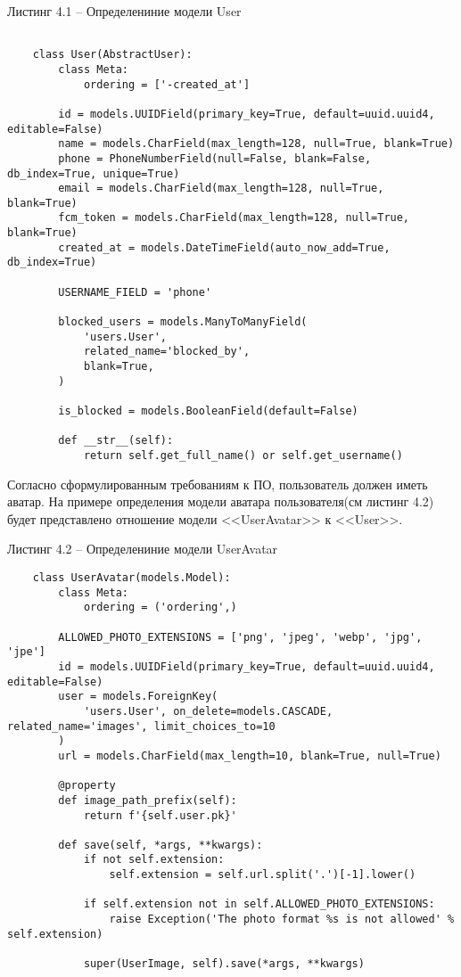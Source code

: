 Листинг 4.1 – Определениние модели User
\begin{lstlisting}

    class User(AbstractUser):
        class Meta:
            ordering = ['-created_at']

        id = models.UUIDField(primary_key=True, default=uuid.uuid4, editable=False)
        name = models.CharField(max_length=128, null=True, blank=True)
        phone = PhoneNumberField(null=False, blank=False, db_index=True, unique=True)
        email = models.CharField(max_length=128, null=True, blank=True)
        fcm_token = models.CharField(max_length=128, null=True, blank=True)
        created_at = models.DateTimeField(auto_now_add=True, db_index=True)

        USERNAME_FIELD = 'phone'

        blocked_users = models.ManyToManyField(
            'users.User',
            related_name='blocked_by',
            blank=True,
        )

        is_blocked = models.BooleanField(default=False)

        def __str__(self):
            return self.get_full_name() or self.get_username()
\end{lstlisting}

Согласно сформулированным требованиям к ПО, пользователь должен иметь аватар.
На примере определения модели аватара пользователя(см листинг 4.2) будет представлено отношение модели <<UserAvatar>> к <<User>>.

Листинг 4.2 – Определениние модели UserAvatar
\begin{lstlisting}
    class UserAvatar(models.Model):
        class Meta:
            ordering = ('ordering',)

        ALLOWED_PHOTO_EXTENSIONS = ['png', 'jpeg', 'webp', 'jpg', 'jpe']
        id = models.UUIDField(primary_key=True, default=uuid.uuid4, editable=False)
        user = models.ForeignKey(
            'users.User', on_delete=models.CASCADE, related_name='images', limit_choices_to=10
        )
        url = models.CharField(max_length=10, blank=True, null=True)

        @property
        def image_path_prefix(self):
            return f'{self.user.pk}'

        def save(self, *args, **kwargs):
            if not self.extension:
                self.extension = self.url.split('.')[-1].lower()

            if self.extension not in self.ALLOWED_PHOTO_EXTENSIONS:
                raise Exception('The photo format %s is not allowed' % self.extension)

            super(UserImage, self).save(*args, **kwargs)

\end{lstlisting}

